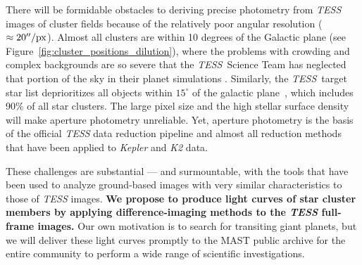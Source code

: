 \documentclass[letterpaper,11pt]{article}
\begin{document}
There will be formidable obstacles to deriving precise
photometry from {\it TESS} images of cluster fields because
of the relatively poor angular resolution ($\approx 20''/{\rm px}$).
Almost all clusters are within 10 degrees of the Galactic
plane (see Figure~\ref{fig:cluster_positions_dilution}),
where the problems with crowding and complex backgrounds are so severe that 
the {\it TESS}\,
Science Team has neglected that portion of the sky in their planet
simulations \citep{Sullivan_et_al_2015}. 
Similarly, the {\it TESS}\, target star list deprioritizes all objects 
within $15^\circ$ of the galactic plane~\citep{Stassun_et_al_2017}, which 
includes 90\% of
all star clusters.  The large pixel size and the high stellar surface
density will make aperture photometry unreliable.  Yet,
aperture photometry is the basis of the official {\it TESS} data
reduction pipeline and almost all reduction methods that have been
applied to {\it Kepler} and {\it K2} data.

These challenges are substantial --- and surmountable, with the tools
that have been used to analyze ground-based images with very similar 
characteristics to those of {\it TESS} images.  {\bf We
  propose to produce light curves of star cluster members by applying
  difference-imaging methods to the {\it TESS} full-frame images.}
Our own motivation is to search for transiting giant planets, but we will 
deliver these light curves promptly to the MAST public archive
for the entire community to perform a wide range of scientific
investigations.
\end{document}
